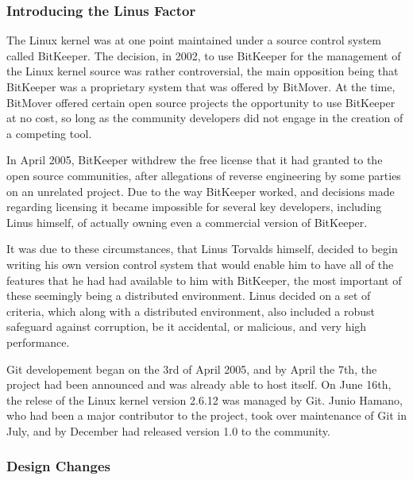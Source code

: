 \subsubsection{Introducing the Linus Factor}
The Linux kernel was at one point maintained under a source control system called BitKeeper.  The decision, in 2002, to use BitKeeper for the management of the Linux kernel source was rather controversial, the main opposition being that BitKeeper was a proprietary system that was offered by BitMover.  At the time, BitMover offered certain open source projects the opportunity to use BitKeeper at no cost, so long as the community developers did not engage in the creation of a competing tool.

In April 2005, BitKeeper withdrew the free license that it had granted to the open source communities, after allegations of reverse engineering by some parties on an unrelated project.  Due to the way BitKeeper worked, and decisions made regarding licensing it became impossible for several key developers, including Linus himself, of actually owning even a commercial version of BitKeeper.

It was due to these circumstances, that Linus Torvalds himself, decided to begin writing his own version control system that would enable him to have all of the features that he had had available to him with BitKeeper, the most important of these seemingly being a distributed environment.  Linus decided on a set of criteria, which along with a distributed environment, also included a robust safeguard against corruption, be it accidental, or malicious, and very high performance.

Git developement began on the 3rd of April 2005, and by April the 7th, the project had been announced and was already able to host itself.  On June 16th, the relese of the Linux kernel version 2.6.12 was managed by Git.  Junio Hamano, who had been a major contributor to the project, took over maintenance of Git in July, and by December had released version 1.0 to the community.

\subsubsection{Design Changes}




